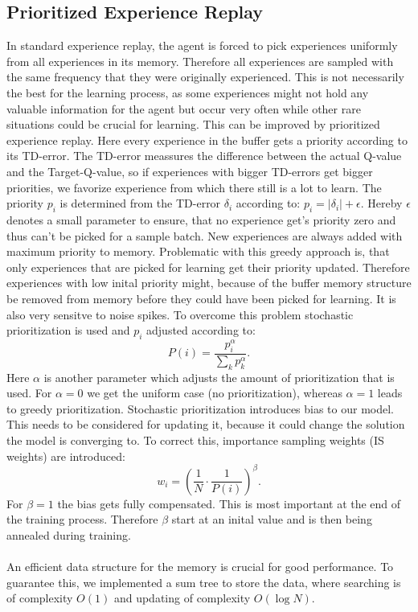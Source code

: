 \documentclass[12pt]{article}
\begin{document}
\subsection{Prioritized Experience Replay}
In standard experience replay, the agent is forced to pick experiences uniformly from all experiences in its memory. Therefore all experiences are sampled with the same frequency that they were originally experienced.
This is not necessarily the best for the learning process, as some experiences might not hold any valuable information for the agent but occur very often while other rare situations could be crucial for learning.
This can be improved by prioritized experience replay. Here every experience in the buffer gets a priority according to its TD-error.
The TD-error meassures the difference between the actual Q-value and the Target-Q-value, so if experiences with bigger TD-errors get bigger priorities, we favorize experience from which there still is a lot to learn.
The priority $p_i$ is determined from the TD-error $\delta_i$ according to:
$p_{i}=\left|\delta_{i}\right|+\epsilon $. Hereby $\epsilon$ denotes a small parameter to ensure, that no experience get's priority zero and thus can't be picked for a sample batch.
New experiences are always added with maximum priority to memory.
Problematic with this greedy approach is, that only experiences that are picked for learning get their priority updated. Therefore experiences with low inital priority might, because of the buffer memory structure be removed from memory before they could have been picked for learning. It is also very sensitve to noise spikes.
To overcome this problem stochastic prioritization is used and $p_i$ adjusted according to:
\begin{equation}
P(i)=\frac{p_{i}^{\alpha}}{\sum_{k} p_{k}^{\alpha}}.
\end{equation}
Here $\alpha$ is another parameter which adjusts the amount of prioritization that is used. For $\alpha=0$ we get the uniform case (no prioritization), whereas $\alpha=1$ leads to greedy prioritization.
Stochastic prioritization introduces bias to our model. This needs to be considered for updating it, because it could change the solution the model is converging to. To correct this, importance sampling weights (IS weights) are introduced: 
\begin{equation}
w_{i}=\left(\frac{1}{N} \cdot \frac{1}{P(i)}\right)^{\beta}.
\end{equation}
For $\beta=1$ the bias gets fully compensated. This is most important at the end of the training process. Therefore $\beta$ start at an inital value and is then being annealed during training. \\\\
An efficient data structure for the memory is crucial for good performance.
To guarantee this, we implemented a sum tree to store the data, where searching is of complexity $O(1)$ and updating of complexity $O(\log N)$.
\end{document}
